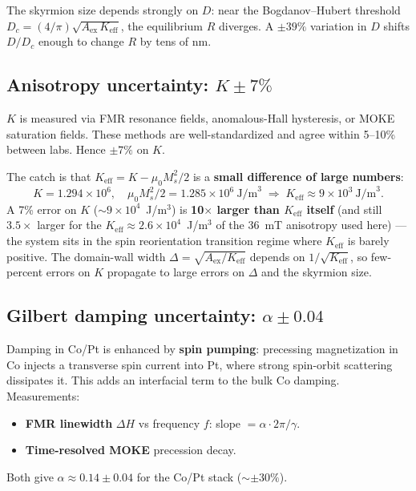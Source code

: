 \documentclass[11pt,a4paper]{article}
\newcommand{\Keff}{K_{\text{eff}}}
\newcommand{\Aex}{A_{\text{ex}}}
\newcommand{\Ms}{M_s}
\begin{document}
The skyrmion size depends strongly on $D$: near the Bogdanov--Hubert
threshold $D_c = (4/\pi)\sqrt{\Aex\,\Keff}$, the equilibrium $R$
diverges. A $\pm 39\%$ variation in $D$ shifts $D/D_c$ enough to
change $R$ by tens of nm.

\subsection{Anisotropy uncertainty: $K \pm 7\%$}
\label{sec:k_uncertainty}

$K$ is measured via FMR resonance fields, anomalous-Hall hysteresis,
or MOKE saturation fields. These methods are well-standardized and
agree within 5--10\% between labs. Hence $\pm 7\%$ on $K$.

The catch is that $\Keff = K - \mu_0 \Ms^2/2$ is a
\textbf{small difference of large numbers}:
%
\begin{equation}
K = 1.294\times 10^6,\quad
\mu_0 \Ms^2/2 = 1.285\times 10^6\ \text{J/m}^3
\;\Longrightarrow\;
\Keff \approx 9\times 10^3\ \text{J/m}^3.
\end{equation}
%
A 7\% error on $K$ ($\sim 9\times 10^4$~J/m$^3$) is
\textbf{10$\times$ larger than $\Keff$ itself} (and still
$3.5\times$ larger for the $\Keff \approx 2.6\times10^4$~J/m$^3$ of
the $36$~mT anisotropy used here) --- the system sits in
the spin reorientation transition regime where $\Keff$ is barely
positive. The domain-wall width $\Delta = \sqrt{\Aex/\Keff}$
depends on $1/\sqrt{\Keff}$, so few-percent errors on $K$ propagate
to large errors on $\Delta$ and the skyrmion size.

\subsection{Gilbert damping uncertainty: $\alpha \pm 0.04$}

Damping in Co/Pt is enhanced by \textbf{spin pumping}: precessing
magnetization in Co injects a transverse spin current into Pt, where
strong spin-orbit scattering dissipates it. This adds an interfacial
term to the bulk Co damping. Measurements:
\begin{itemize}[leftmargin=2em, nosep]
    \item \textbf{FMR linewidth} $\Delta H$ vs frequency $f$:
        slope $= \alpha \cdot 2\pi/\gamma$.
    \item \textbf{Time-resolved MOKE} precession decay.
\end{itemize}
Both give $\alpha \approx 0.14 \pm 0.04$ for the Co/Pt stack
($\sim \pm 30\%$).
\end{document}
